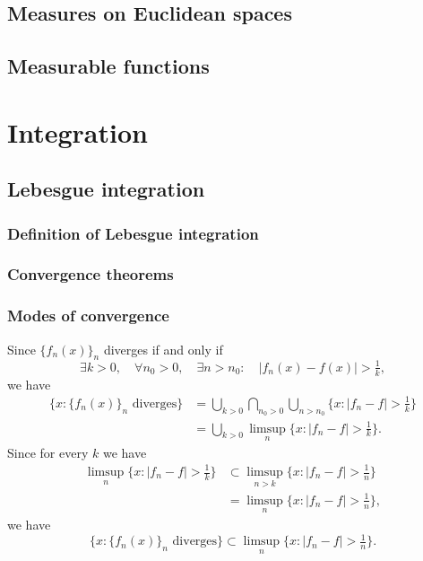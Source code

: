 \documentclass{../note}
\begin{document}
\chapter{Measures on Euclidean spaces}

\chapter{Measurable functions}

\chapter{}






\part{Integration}

\chapter{Lebesgue integration}
\section{Definition of Lebesgue integration}
\section{Convergence theorems}

\section{Modes of convergence}

Since $\{f_n(x)\}_n$ diverges if and only if
\[\exists k>0,\quad\forall n_0>0,\quad\exists n>n_0:\quad|f_n(x)-f(x)|>\tfrac1k,\]
we have
\begin{align*}
\{x:\{f_n(x)\}_n\text{ diverges}\}
&=\bigcup_{k>0}\bigcap_{n_0>0}\bigcup_{n>n_0}\{x:|f_n-f|>\tfrac1k\}\\
&=\bigcup_{k>0}\limsup_n\{x:|f_n-f|>\tfrac1k\}.
\end{align*}
Since for every $k$ we have
\begin{align*}
\limsup_n\{x:|f_n-f|>\tfrac1k\}
&\subset\limsup_{n>k}\{x:|f_n-f|>\tfrac1n\}\\
&=\limsup_n\{x:|f_n-f|>\tfrac1n\},
\end{align*}
we have
\[\{x:\{f_n(x)\}_n\text{ diverges}\}\subset\limsup_n\{x:|f_n-f|>\tfrac1n\}.\]
\end{document}
